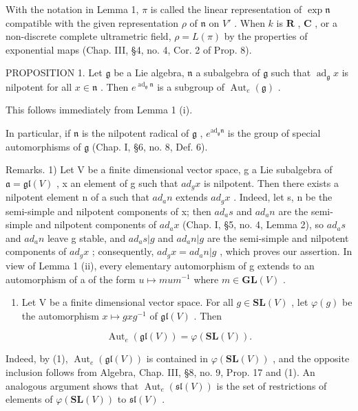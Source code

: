 With the notation in Lemma 1, \(\pi\) is called the linear representation of \(\exp \mathfrak{n}\) compatible with the given representation \(\rho\) of \(\mathfrak{n}\) on \(V'\) . When \(k\) is \(\mathbf{R}\) , \(\mathbf{C}\) , or a non-discrete complete ultrametric field, \(\rho = L(\pi)\) by the properties of exponential maps (Chap. III, §4, no. 4, Cor. 2 of Prop. 8).

PROPOSITION 1. Let \(\mathfrak{g}\) be a Lie algebra, \(\mathfrak{n}\) a subalgebra of \(\mathfrak{g}\) such that \(\operatorname{ad}_{\mathfrak{g}}x\) is nilpotent for all \(x\in \mathfrak{n}\) . Then \(e^{\operatorname{ad}_{\mathfrak{g}}\mathfrak{n}}\) is a subgroup of \(\operatorname{Aut}_e(\mathfrak{g})\) .

This follows immediately from Lemma 1 (i).

In particular, if \(\mathfrak{n}\) is the nilpotent radical of \(\mathfrak{g}\) , \(e^{\mathrm{ad}_{\mathfrak{g}}\mathfrak{n}}\) is the group of special automorphisms of \(\mathfrak{g}\) (Chap. I, §6, no. 8, Def. 6).

Remarks. 1) Let V be a finite dimensional vector space, g a Lie subalgebra of \(\mathfrak{a} = \mathfrak{gl}(V)\) , x an element of g such that \(ad_{g}x\) is nilpotent. Then there exists a nilpotent element n of a such that \(ad_{a}n\) extends \(ad_{g}x\) . Indeed, let s, n be the semi-simple and nilpotent components of x; then \(ad_{a}s\) and \(ad_{a}n\) are the semi-simple and nilpotent components of \(ad_{a}x\) (Chap. I, §5, no. 4, Lemma 2), so \(ad_{a}s\) and \(ad_{a}n\) leave g stable, and \(ad_{a}s|g\) and \(ad_{a}n|g\) are the semi-simple and nilpotent components of \(ad_{g}x\) ; consequently, \(ad_{g}x = ad_{a}n|g\) , which proves our assertion. In view of Lemma 1 (ii), every elementary automorphism of g extends to an automorphism of a of the form \(u \mapsto mum^{-1}\) where \(m \in \mathbf{GL}(V)\) .

\begin{enumerate}
\def\labelenumi{\arabic{enumi})}
\setcounter{enumi}{1}
\tightlist
\item
  Let V be a finite dimensional vector space. For all \(g \in \mathbf{SL}(V)\) , let \(\varphi(g)\) be the automorphism \(x \mapsto gxg^{-1}\) of \(\mathfrak{gl}(V)\) . Then
\end{enumerate}

\[
\operatorname{Aut} _ {e} (\mathfrak {g l} (V)) = \varphi (\mathbf {S L} (V)).
\]

Indeed, by (1), \(\operatorname{Aut}_{e}(\mathfrak{gl}(V))\) is contained in \(\varphi(\mathbf{SL}(V))\) , and the opposite inclusion follows from Algebra, Chap. III, §8, no. 9, Prop. 17 and (1). An analogous argument shows that \(\operatorname{Aut}_{e}(\mathfrak{sl}(V))\) is the set of restrictions of elements of \(\varphi(\mathbf{SL}(V))\) to \(\mathfrak{sl}(V)\) .

